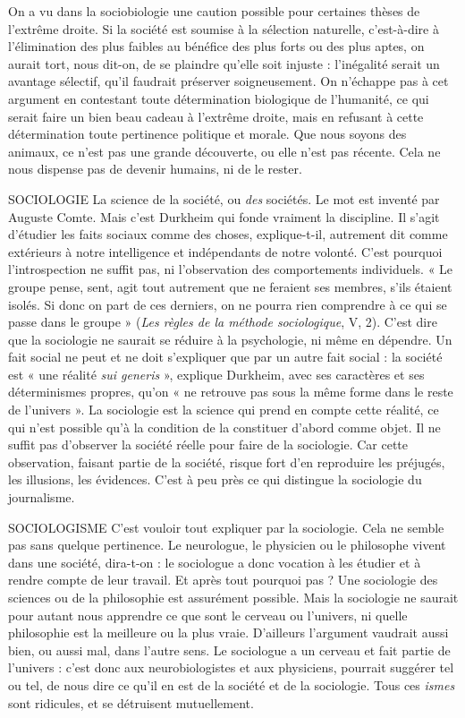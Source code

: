 On a vu dans la sociobiologie une caution possible pour certaines thèses de
l'extrême droite. Si la société est soumise à la sélection naturelle, c’est-à-dire à
l'élimination des plus faibles au bénéfice des plus forts ou des plus aptes, on
aurait tort, nous dit-on, de se plaindre qu’elle soit injuste : l'inégalité serait un
avantage sélectif, qu’il faudrait préserver soigneusement. On n'échappe pas à
cet argument en contestant toute détermination biologique de l’humanité, ce
qui serait faire un bien beau cadeau à l'extrême droite, mais en refusant à cette
détermination toute pertinence politique et morale. Que nous soyons des animaux,
ce n'est pas une grande découverte, ou elle n’est pas récente. Cela ne
nous dispense pas de devenir humains, ni de le rester.

SOCIOLOGIE La science de la société, ou {\it des} sociétés. Le mot est inventé
par Auguste Comte. Mais c’est Durkheim qui fonde vraiment
la discipline. Il s’agit d'étudier les faits sociaux comme des choses,
explique-t-il, autrement dit comme extérieurs à notre intelligence et indépendants
de notre volonté. C’est pourquoi l’introspection ne suffit pas, ni l’observation
des comportements individuels. « Le groupe pense, sent, agit tout autrement
 que ne feraient ses membres, s’ils étaient isolés. Si donc on part de ces
derniers, on ne pourra rien comprendre à ce qui se passe dans le groupe » ({\it Les
règles de la méthode sociologique}, V, 2). C’est dire que la sociologie ne saurait se
réduire à la psychologie, ni même en dépendre. Un fait social ne peut et ne doit
s'expliquer que par un autre fait social : la société est « une réalité {\it sui generis} »,
explique Durkheim, avec ses caractères et ses déterminismes propres, qu’on
« ne retrouve pas sous la même forme dans le reste de l’univers ». La sociologie
est la science qui prend en compte cette réalité, ce qui n’est possible qu’à la
condition de la constituer d’abord comme objet. Il ne suffit pas d’observer la
société réelle pour faire de la sociologie. Car cette observation, faisant partie de
la société, risque fort d’en reproduire les préjugés, les illusions, les évidences.
C’est à peu près ce qui distingue la sociologie du journalisme.

SOCIOLOGISME C’est vouloir tout expliquer par la sociologie. Cela ne
semble pas sans quelque pertinence. Le neurologue, le
physicien ou le philosophe vivent dans une société, dira-t-on : le sociologue a
donc vocation à les étudier et à rendre compte de leur travail. Et après tout
pourquoi pas ? Une sociologie des sciences ou de la philosophie est assurément
possible. Mais la sociologie ne saurait pour autant nous apprendre ce que sont
le cerveau ou l'univers, ni quelle philosophie est la meilleure ou la plus vraie.
D'ailleurs l'argument vaudrait aussi bien, ou aussi mal, dans l’autre sens. Le
sociologue a un cerveau et fait partie de l’univers : c’est donc aux neurobiologistes
et aux physiciens, pourrait suggérer tel ou tel, de nous dire ce qu’il en est
de la société et de la sociologie. Tous ces {\it ismes} sont ridicules, et se détruisent
mutuellement.

